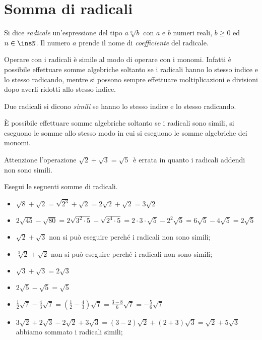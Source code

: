 \section{Somma di radicali}
\label{sec:radici_somma}

Si dice \emph{radicale} un'espressione del tipo $a\sqrt[n]b$ con $a$ e $b$ 
numeri reali, $b{\geq}0$ ed $n\in \insN$. Il numero $a$ prende il nome di 
\emph{coefficiente} del radicale.

Operare con i radicali è simile al modo di operare con i monomi. Infatti è 
possibile effettuare somme algebriche soltanto se i radicali hanno lo 
stesso 
indice e lo stesso radicando, mentre si possono sempre effettuare 
moltiplicazioni e divisioni dopo averli ridotti allo stesso indice.
\begin{definizione}
 Due radicali si dicono \emph{simili} se hanno lo stesso indice e lo stesso 
 radicando.
\end{definizione}

È possibile effettuare somme algebriche soltanto se i radicali sono simili, 
si eseguono le somme allo stesso modo in cui si eseguono le somme 
algebriche 
dei monomi.

Attenzione l'operazione $\sqrt{2}+\sqrt{3}=\sqrt 5$\, è errata in quanto i 
radicali addendi non sono simili.
 \begin{esempio}
Esegui le seguenti somme di radicali.
\begin{itemize}
 \item $\sqrt 8+\sqrt{2}=\sqrt{2^3}+\sqrt{2}=2\sqrt{2}+\sqrt{2}=3\sqrt{2}$
 \item $2\sqrt{45}-\sqrt{80}=2\sqrt{3^2\cdot 5}-\sqrt{2^4\cdot 5}=
        2\cdot 3\cdot \sqrt 5-2^2\sqrt 5=6\sqrt 5-4\sqrt 5=2\sqrt 5$
 \item $\sqrt{2}+\sqrt{3}$
  non si può eseguire perché i radicali non sono simili;
 \item $\sqrt[3]2+\sqrt{2}$
  non si può eseguire perché i radicali non sono simili;
 \item $\sqrt{3}+\sqrt{3}=2\sqrt{3}$
 \item $2\sqrt 5-\sqrt 5=\sqrt 5$
 \item $\frac 1 2\sqrt 7-\frac 4 3\sqrt 7=
        \left(\frac 1 2-\frac 4 3\right)\sqrt 7=\frac{3-8} 6\sqrt 7=
        -\frac 5 6\sqrt 7$
 \item $3\sqrt{2}+2\sqrt{3}-2\sqrt{2}+3\sqrt{3}=(3-2)\sqrt{2}+(2+3)\sqrt{3}=
        \sqrt{2}+5\sqrt{3}$ abbiamo sommato i radicali simili;
\end{itemize}
 \end{esempio}

